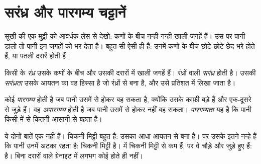 \section{सरंध्र और पारगम्य चट्टानें}

सूखी  की एक मुट्ठी को आवर्धक लेंस से देखो: कणों के बीच नन्ही-नन्ही खाली
जगहें हैं। उस पर पानी डालो तो पानी इन जगहों को भर देता है। बहुत-सी 
ऐसी ही हैं: उनमें कणों के बीच छोटे-छोटे छेद भरे होते हैं, या पतली दरारें
होती हैं।

\begin{definition}[सरंध्रता]\label{def:g6:water-underground:porosity}
किसी  के \emph{रंध्र} उसके कणों के बीच और उसकी दरारों में
खाली जगहें हैं। रंध्रों वाली  \emph{सरंध्र} होती है। उसकी
\emph{सरंध्रता} उसके आयतन का वह हिस्सा है जो रंध्रों से बना है,
और उसे प्रतिशत में लिखा जाता है।
\end{definition}

\begin{definition}[पारगम्यता]\label{def:g6:water-underground:permeability}
कोई  \emph{पारगम्य} होती है जब पानी उसमें से होकर बह
सकता है, क्योंकि उसके  काफ़ी बड़े हैं और एक-दूसरे से जुड़े हैं। वह
\emph{अपारगम्य} होती है जब पानी उसमें से होकर नहीं बह सकता।
\emph{पारगम्यता} यह है कि पानी किसी  में से कितनी
आसानी से बहता है।
\end{definition}

ये दोनों बातें एक नहीं हैं। चिकनी मिट्टी बहुत  है: उसका आधा आयतन
 से बना है। पर उसके  इतने नन्हे हैं कि पानी उनमें अटका रहता है:
चिकनी मिट्टी \emph{} है।  में चिकनी मिट्टी से कम  हैं, पर वे
चौड़े और जुड़े हुए हैं:  \emph{} है। बिना दरारों वाले ग्रेनाइट में
लगभग कोई  होते ही नहीं।

